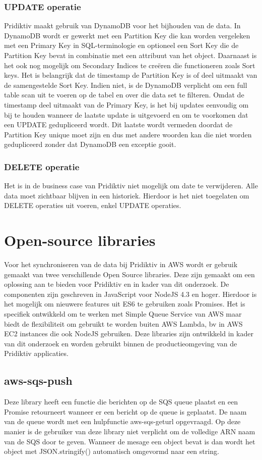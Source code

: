 \subsubsection{UPDATE operatie}
Pridiktiv maakt gebruik van DynamoDB voor het bijhouden van de data. In DynamoDB wordt er gewerkt met een Partition Key die kan worden vergeleken met een Primary Key in SQL-terminologie en optioneel een Sort Key die  de Partition Key bevat in combinatie met een attribuut van het object. Daarnaast is het ook nog mogelijk om Secondary Indices te cre\"eren die functioneren zoals Sort keys.  Het is belangrijk dat de timestamp de Partition Key is of deel uitmaakt van de samengestelde Sort Key. Indien niet, is de DynamoDB verplicht om een full table scan uit te voeren op de tabel en over die data set te filteren. Omdat de timestamp deel uitmaakt van de Primary Key, is het bij updates eenvoudig om bij te houden wanneer de laatste update is uitgevoerd en om te voorkomen dat een UPDATE gedupliceerd wordt. Dit laatste wordt vermeden doordat de Partition Key unique moet zijn en dus met andere woorden kan die niet worden gedupliceerd zonder dat DynamoDB een exceptie gooit.
\subsubsection{DELETE operatie}
Het is in de business case van Pridiktiv niet mogelijk om date te verwijderen. Alle data moet zichtbaar blijven in een historiek. Hierdoor is het niet toegelaten om DELETE operaties uit voeren, enkel UPDATE operaties. 
\section{Open-source libraries}
Voor het synchroniseren van de data bij Pridiktiv in AWS wordt er gebruik gemaakt van twee verschillende Open Source libraries. Deze zijn gemaakt om een oplossing aan te bieden voor Pridiktiv en in kader van dit onderzoek. De componenten zijn geschreven in JavaScript voor NodeJS 4.3 en hoger. Hierdoor is het mogelijk om nieuwere features uit ES6 te gebruiken zoals Promises. Het is specifiek ontwikkeld om te werken met Simple Queue Service van AWS maar biedt de flexibiliteit om gebruikt te worden buiten AWS Lambda, bv in AWS EC2 instances die ook NodeJS gebruiken. Deze libraries zijn ontwikkeld in kader van dit onderzoek en worden gebruikt binnen de productieomgeving van de Pridiktiv applicaties.
\subsection{aws-sqs-push}
Deze library heeft een functie die berichten op de SQS queue plaatst en een Promise retourneert wanneer er een bericht op de queue is geplaatst. De naam van de queue wordt met een hulpfunctie aws-sqs-geturl opgevraagd. Op deze manier is de gebruiker van deze library niet verplicht om de volledige ARN naam van de SQS door te geven. Wanneer de mesage een object bevat is dan wordt het object met JSON.stringify() automatisch omgevormd naar een string.

